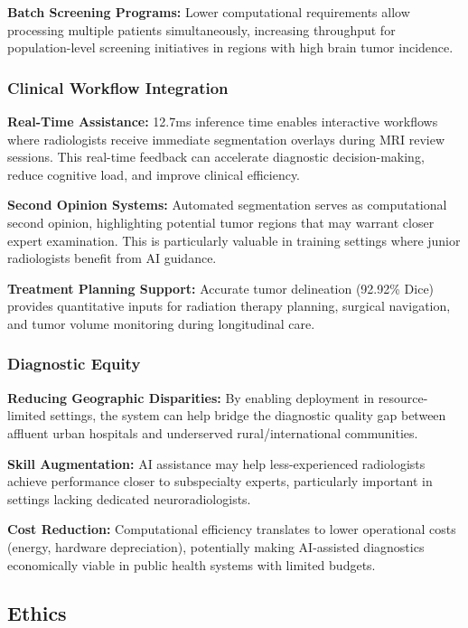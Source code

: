 \textbf{Batch Screening Programs:} Lower computational requirements allow processing multiple patients simultaneously, increasing throughput for population-level screening initiatives in regions with high brain tumor incidence.

\subsubsection{Clinical Workflow Integration}

\textbf{Real-Time Assistance:} 12.7ms inference time enables interactive workflows where radiologists receive immediate segmentation overlays during MRI review sessions. This real-time feedback can accelerate diagnostic decision-making, reduce cognitive load, and improve clinical efficiency.

\textbf{Second Opinion Systems:} Automated segmentation serves as computational second opinion, highlighting potential tumor regions that may warrant closer expert examination. This is particularly valuable in training settings where junior radiologists benefit from AI guidance.

\textbf{Treatment Planning Support:} Accurate tumor delineation (92.92\% Dice) provides quantitative inputs for radiation therapy planning, surgical navigation, and tumor volume monitoring during longitudinal care.

\subsubsection{Diagnostic Equity}

\textbf{Reducing Geographic Disparities:} By enabling deployment in resource-limited settings, the system can help bridge the diagnostic quality gap between affluent urban hospitals and underserved rural/international communities.

\textbf{Skill Augmentation:} AI assistance may help less-experienced radiologists achieve performance closer to subspecialty experts, particularly important in settings lacking dedicated neuroradiologists.

\textbf{Cost Reduction:} Computational efficiency translates to lower operational costs (energy, hardware depreciation), potentially making AI-assisted diagnostics economically viable in public health systems with limited budgets.


\subsection{Ethics}

